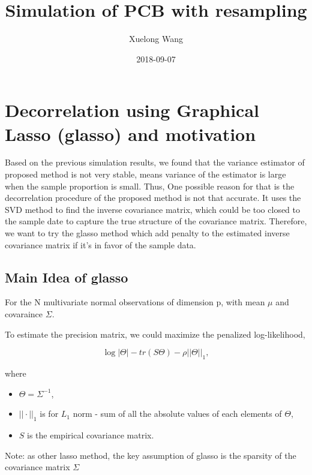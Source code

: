 \documentclass[]{article}
\title{Simulation of PCB with resampling}
\author{Xuelong Wang}
\date{2018-09-07}
\providecommand{\tightlist}{%
  \setlength{\itemsep}{0pt}\setlength{\parskip}{0pt}}
\begin{document}
\maketitle

{
\setcounter{tocdepth}{2}
\tableofcontents
}
\section{Decorrelation using Graphical Lasso (glasso) and
motivation}\label{decorrelation-using-graphical-lasso-glasso-and-motivation}

Based on the previous simulation results, we found that the variance
estimator of proposed method is not very stable, means variance of the
estimator is large when the sample proportion is small. Thus, One
possible reason for that is the decorrelation procedure of the proposed
method is not that accurate. It uses the SVD method to find the inverse
covariance matrix, which could be too closed to the sample date to
capture the true structure of the covariance matrix. Therefore, we want
to try the glasso method which add penalty to the estimated inverse
covariance matrix if it's in favor of the sample data.

\subsection{Main Idea of glasso}\label{main-idea-of-glasso}

For the N multivariate normal observations of dimension p, with mean
\(\mu\) and covaraince \(\Sigma\).

To estimate the precision matrix, we could maximize the penalized
log-likelihood,

\[
  \log{|\Theta|} - tr(S\Theta) - \rho||\Theta||_1,
\]

where

\begin{itemize}
\tightlist
\item
  \(\Theta = \Sigma^{-1}\),\\
\item
  \(||\cdot||_1\) is for \(L_1\) norm - sum of all the absolute values
  of each elements of \(\Theta\),\\
\item
  \(S\) is the empirical covariance matrix.
\end{itemize}

Note: as other lasso method, the key assumption of glasso is the
sparsity of the covariance matrix \(\Sigma\)
\end{document}
